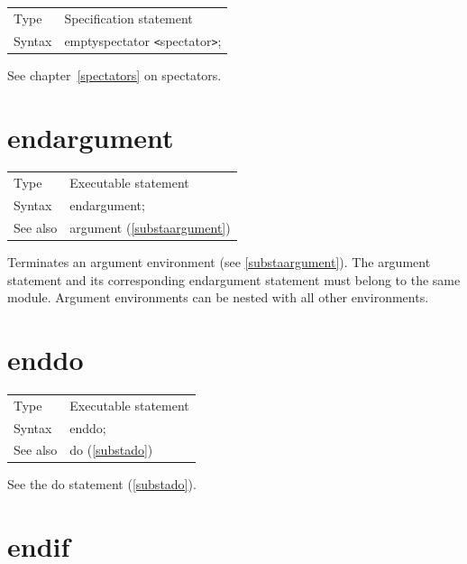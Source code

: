 \noindent \begin{tabular}{ll}
Type & Specification statement\\
Syntax & emptyspectator {\tt<}spectator{\tt>};
\end{tabular} \vspace{4mm}

\noindent See chapter~\ref{spectators} on spectators.
\vspace{10mm}


\section{endargument}
\label{substaendargument}

\noindent \begin{tabular}{ll}
Type & Executable statement\\
Syntax & endargument; \\
See also & argument (\ref{substaargument})
\end{tabular} \vspace{4mm}

\noindent Terminates an argument environment 
(see \ref{substaargument}). The argument statement and its 
corresponding endargument statement must belong to the 
same module. Argument environments can be nested with all other 
environments. \vspace{10mm}


\section{enddo}
\label{substaenddo}

\noindent \begin{tabular}{ll}
Type & Executable statement\\
Syntax & enddo;
\\ See also & do (\ref{substado})
\end{tabular} \vspace{4mm}

See the do statement (\ref{substado}).
\vspace{10mm}


\section{endif}
\label{substaendif}

